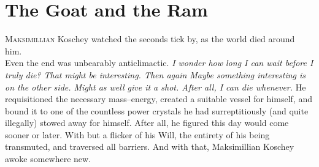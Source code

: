 \chapter{The Goat and the Ram}


\lettrine{M}{aksimillian} Koschey watched the seconds tick by, as the world died around him.\\Even the end was unbearably anticlimactic.
\SmallVSpace
\emph{I wonder how long I can wait before I truly die? That might be interesting. Then again{\el} Maybe something interesting is on the other side. Might as well give it a shot. After all, I can die whenever.}
\SmallVSpace
He requisitioned the necessary mass\mbox{--}energy, created a suitable vessel for himself, and bound it to one of the countless power crystals he had surreptitiously (and quite illegally) stowed away for himself. After all, he figured this day would come sooner or later.
\SmallVSpace
With but a flicker of his Will, the entirety of his being transmuted, and traversed all barriers.
\SomeVSpace
And with that, Maksimillian Koschey awoke somewhere new.
\simpleline
{}

